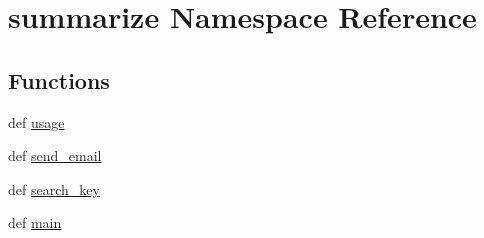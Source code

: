 \hypertarget{namespacesummarize}{\section{summarize Namespace Reference}
\label{namespacesummarize}
}
\subsection*{Functions}
\begin{DoxyCompactItemize}
\item 
def \hyperlink{namespacesummarize_a80129c87c14bafb97fd9b18c64d12532}{usage}
\item 
def \hyperlink{namespacesummarize_a0d5100a97171b34c0925c390bdc31bac}{send\-\_\-email}
\item 
def \hyperlink{namespacesummarize_a0d81e163f573062b86af81d28d5aa492}{search\-\_\-key}
\item 
def \hyperlink{namespacesummarize_acc9b4a5f77cc075474626e18ef4c4651}{main}
\end{DoxyCompactItemize}
